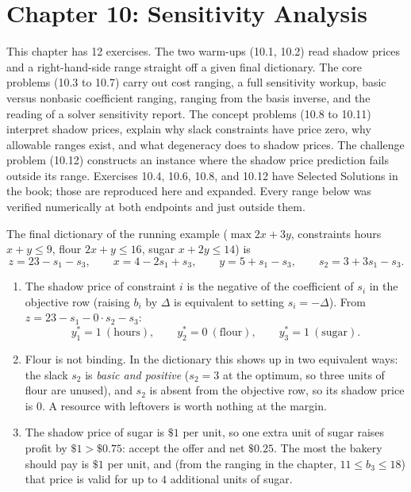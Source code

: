 \section{Chapter 10: Sensitivity Analysis}

This chapter has 12 exercises. The two warm-ups (10.1, 10.2) read shadow prices and a right-hand-side range straight off a given final dictionary. The core problems (10.3 to 10.7) carry out cost ranging, a full sensitivity workup, basic versus nonbasic coefficient ranging, ranging from the basis inverse, and the reading of a solver sensitivity report. The concept problems (10.8 to 10.11) interpret shadow prices, explain why slack constraints have price zero, why allowable ranges exist, and what degeneracy does to shadow prices. The challenge problem (10.12) constructs an instance where the shadow price prediction fails outside its range. Exercises 10.4, 10.6, 10.8, and 10.12 have Selected Solutions in the book; those are reproduced here and expanded. Every range below was verified numerically at both endpoints and just outside them.


The final dictionary of the running example ($\max 2x + 3y$, constraints hours $x+y \le 9$, flour $2x+y \le 16$, sugar $x + 2y \le 14$) is
\[
z = 23 - s_1 - s_3, \qquad
x = 4 - 2s_1 + s_3, \qquad
y = 5 + s_1 - s_3, \qquad
s_2 = 3 + 3s_1 - s_3 .
\]

\begin{enumerate}
\item The shadow price of constraint $i$ is the negative of the coefficient of $s_i$ in the objective row (raising $b_i$ by $\Delta$ is equivalent to setting $s_i = -\Delta$). From $z = 23 - s_1 - 0\cdot s_2 - s_3$:
\[
y_1^* = 1 \ (\text{hours}), \qquad y_2^* = 0 \ (\text{flour}), \qquad y_3^* = 1 \ (\text{sugar}).
\]
\item Flour is not binding. In the dictionary this shows up in two equivalent ways: the slack $s_2$ is \emph{basic and positive} ($s_2 = 3$ at the optimum, so three units of flour are unused), and $s_2$ is absent from the objective row, so its shadow price is $0$. A resource with leftovers is worth nothing at the margin.
\item The shadow price of sugar is $\$1$ per unit, so one extra unit of sugar raises profit by $\$1 > \$0.75$: accept the offer and net $\$0.25$. The most the bakery should pay is $\$1$ per unit, and (from the ranging in the chapter, $11 \le b_3 \le 18$) that price is valid for up to $4$ additional units of sugar.
\end{enumerate}

